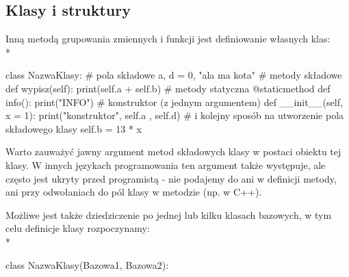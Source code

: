 % 
% 
% 
% 

\subsection{Klasy i struktury \zaawansowane{*}}

Inną metodą grupowania zmiennych i funkcji jest definiowanie własnych klas:
\\*
\begin{CodeFrame*}[python]{}
class NazwaKlasy:
  # pola składowe
  a, d = 0, "ala ma kota"
  # metody składowe
  def wypisz(self):
    print(self.a + self.b)
  # metody statyczna
  @staticmethod
  def info():
    print("INFO")
  # konstruktor (z jednym argumentem)
  def __init__(self, x = 1):
    print("konstruktor", self.a , self.d)
    # i kolejny sposób na utworzenie pola składowego klasy
    self.b = 13 * x
\end{CodeFrame*}

Warto zauważyć jawny argument metod składowych klasy w postaci obiektu tej klasy.
W innych językach programowania ten argument także występuje, ale często jest ukryty przed programistą - nie podajemy do ani w definicji metody, ani przy odwołaniach do pól klasy w metodzie (np. w C++).

Możliwe jest także dziedziczenie po jednej lub kilku klasach bazowych, w tym celu definicje klasy rozpoczynamy:
\\*
\begin{CodeFrame*}[python]{}
class NazwaKlasy(Bazowa1, Bazowa2):
\end{CodeFrame*}

